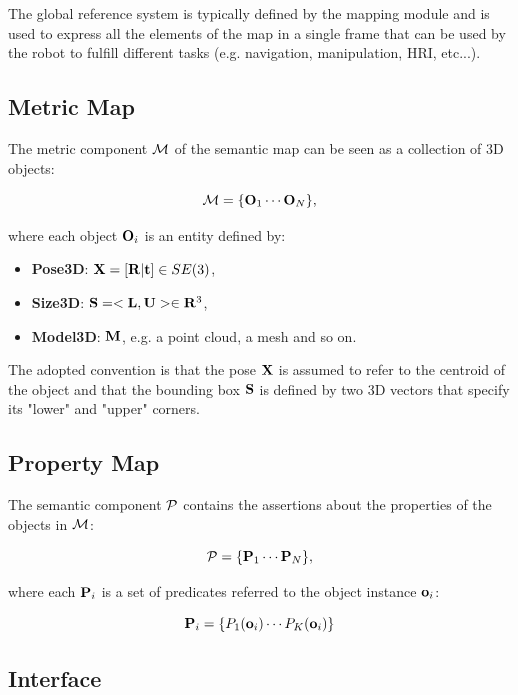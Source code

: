 \documentclass{article}
\begin{document}
	The global reference system is typically defined by the mapping module and is used to express all the elements of the map in a single frame that can be used by the robot to fulfill different tasks (e.g. navigation, manipulation, HRI, etc...).
	
	\subsection{Metric Map}	
		
	The metric component $\mathcal{M}$ of the semantic map can be seen as a collection of 3D objects:
	
	\begin{equation}
		\mathcal{M} = \{\mathbf{O}_1 \cdots \mathbf{O}_N\},
	\end{equation}
	
	\noindent	
	where each object $\mathbf{O}_i$ is an entity defined by:
	
	\begin{itemize}
		\item {\bf Pose3D}: $\mathbf{X} = [ \mathbf{R} | \mathbf{t}] \in SE(3)$,
		\item {\bf Size3D}: $\mathbf{S} = <\mathbf{L} ,\mathbf{U}> \in \mathbf{R}^3 $,
		\item {\bf Model3D}: $\mathbf{M}$, e.g. a point cloud, a mesh and so on.
	\end{itemize}
	
	The adopted convention is that the pose $\mathbf{X}$ is assumed to refer to the centroid of the object and that the bounding box $\mathbf{S}$ is defined by two 3D vectors that specify its "lower" and "upper" corners.
	
	\subsection{Property Map}	
		
	The semantic component $\mathcal{P}$ contains the assertions about the properties of the objects in $\mathcal{M}$:
	
	\begin{equation}
	\mathcal{P} = \{\mathbf{P}_1 \cdots \mathbf{P}_N\},
	\end{equation}
	
	\noindent
	where each $\mathbf{P}_i$ is a set of predicates referred to the object instance $\mathbf{o}_i$:
	
	\begin{equation}
		\mathbf{P}_i = \{ P_1(\mathbf{o}_i) \cdots P_K(\mathbf{o}_i) \}
	\end{equation}


	\subsection{Interface}
	
\end{document}
